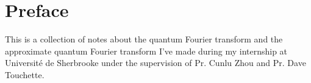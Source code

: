 \section*{Preface}
This is a collection of notes about the quantum Fourier transform and the approximate quantum Fourier transform I've made during my internship at Université de Sherbrooke under the supervision of Pr. Cunlu Zhou and Pr. Dave Touchette.


